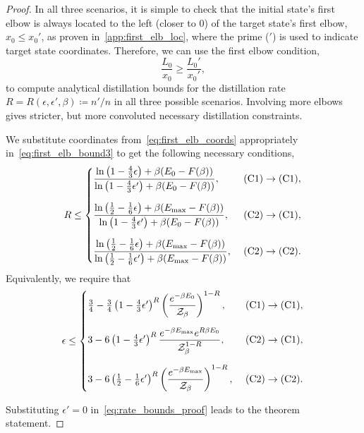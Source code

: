 \documentclass[pra,
aps,
twocolumn,
superscriptaddress,
groupedaddress,
nofootinbib,
reprint
]{revtex4-1}
\begin{document}
\begin{proof}
In all three scenarios, it is simple to check that the initial state's first elbow is always located to the left (closer to $0$) of the target state's first elbow, $x_0 \leq x_0'$, as proven in~\cref{app:first_elb_loc}, where the prime ($'$) is used to indicate target state coordinates.
Therefore, we can use the first elbow condition,
\begin{equation}\label{eq:first_elb_bound3}
	\frac{L_0}{x_0} \geq \frac{L_0'}{x_0'},
\end{equation}
to compute analytical distillation bounds for the distillation rate $R = R(\epsilon, \epsilon', \beta) \coloneqq n'/n$ in all three possible scenarios.
Involving more elbows gives stricter, but more convoluted necessary distillation constraints.

We substitute coordinates from~\cref{eq:first_elb_coords} appropriately in~\cref{eq:first_elb_bound3} to get the following necessary conditions,
\begin{equation}\label{eq:rate_bounds_proof}
	R \leq
	\begin{cases}
		\dfrac{\ln{\big( 1-\frac{4}{3}\epsilon \big)} + \beta (E_0 - F(\beta))}{\ln{\big( 1-\frac{4}{3}\epsilon' \big)} + \beta (E_0 - F(\beta))},\ &\rm{(C1)} \rightarrow \rm{(C1)}, \vspace{10pt}\\
		\dfrac{\ln{\big( \frac{1}{2}-\frac{1}{6}\epsilon \big)} + \beta (E_{\rm{max}} - F(\beta))}{\ln{\big( 1-\frac{4}{3}\epsilon' \big)} + \beta (E_0 - F(\beta))},\ &\rm{(C2)} \rightarrow \rm{(C1)}, \vspace{10pt}\\
		\dfrac{\ln{\big( \frac{1}{2}-\frac{1}{6}\epsilon \big)} + \beta (E_{\rm{max}} - F(\beta))}{\ln{\big( \frac{1}{2}-\frac{1}{6}\epsilon' \big)} + \beta (E_{\rm{max}} - F(\beta))},\ &\rm{(C2)} \rightarrow \rm{(C2)}.
	\end{cases}
\end{equation}
Equivalently, we require that
\begin{equation}\label{eq:error_bounds_proof}
	\epsilon \leq
	\begin{cases}
		\frac{3}{4} - \frac{3}{4} \left( 1 - \frac{4}{3}\epsilon' \right)^{R} \left( \dfrac{e^{-\beta E_0}}{\Z_\beta} \right)^{1 - R},\ &\rm{(C1)} \rightarrow \rm{(C1)}, \vspace{10pt}\\
		3 - 6 \left( 1 - \frac{4}{3}\epsilon' \right)^{R} \dfrac{e^{-\beta E_{\rm{max}}} e^{R\beta E_0}}{\Z_\beta^{1-R}},\ &\rm{(C2)} \rightarrow \rm{(C1)}, \vspace{10pt}\\
		3 - 6 \left( \frac{1}{2} - \frac{1}{6}\epsilon' \right)^{R} \left( \dfrac{e^{-\beta E_{\rm{max}}}}{\Z_\beta} \right)^{1 - R},\ &\rm{(C2)} \rightarrow \rm{(C2)}.
	\end{cases}
\end{equation}

Substituting $\epsilon' = 0$ in~\cref{eq:rate_bounds_proof} leads to the theorem statement.

\end{proof}
\end{document}
